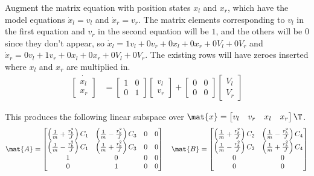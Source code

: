 Augment the matrix equation with position states $x_l$ and $x_r$, which have the
model equations $\dot{x}_l = v_l$ and $\dot{x}_r = v_r$. The matrix elements
corresponding to $v_l$ in the first equation and $v_r$ in the second equation
will be $1$, and the others will be $0$ since they don't appear, so
$\dot{x}_l = 1v_l + 0v_r + 0x_l + 0x_r + 0V_l + 0V_r$ and
$\dot{x}_r = 0v_l + 1v_r + 0x_l + 0x_r + 0V_l + 0V_r$. The existing rows will
have zeroes inserted where $x_l$ and $x_r$ are multiplied in.
\begin{align*}
  \dot{\begin{bmatrix}
    x_l \\
    x_r
  \end{bmatrix}} &=
  \begin{bmatrix}
    1 & 0 \\
    0 & 1
  \end{bmatrix}
  \begin{bmatrix}
    v_l \\
    v_r
  \end{bmatrix} +
  \begin{bmatrix}
    0 & 0 \\
    0 & 0
  \end{bmatrix}
  \begin{bmatrix}
    V_l \\
    V_r
  \end{bmatrix}
\end{align*}

This produces the following linear subspace over
$\mat{x} = \begin{bmatrix}v_l & v_r & x_l & x_r\end{bmatrix}\T$.
\begin{equation}
  \mat{A} =
  \begin{bmatrix}
    \left(\frac{1}{m} + \frac{r_b^2}{J}\right) C_1 &
      \left(\frac{1}{m} - \frac{r_b^2}{J}\right) C_3 & 0 & 0 \\
    \left(\frac{1}{m} - \frac{r_b^2}{J}\right) C_1 &
      \left(\frac{1}{m} + \frac{r_b^2}{J}\right) C_3 & 0 & 0 \\
    1 & 0 & 0 & 0 \\
    0 & 1 & 0 & 0
  \end{bmatrix}
  \quad
  \mat{B} =
  \begin{bmatrix}
    \left(\frac{1}{m} + \frac{r_b^2}{J}\right) C_2 &
      \left(\frac{1}{m} - \frac{r_b^2}{J}\right) C_4 \\
    \left(\frac{1}{m} - \frac{r_b^2}{J}\right) C_2 &
      \left(\frac{1}{m} + \frac{r_b^2}{J}\right) C_4 \\
    0 & 0 \\
    0 & 0
  \end{bmatrix}
  \label{eq:diff_drive_linear_subspace}
\end{equation}

